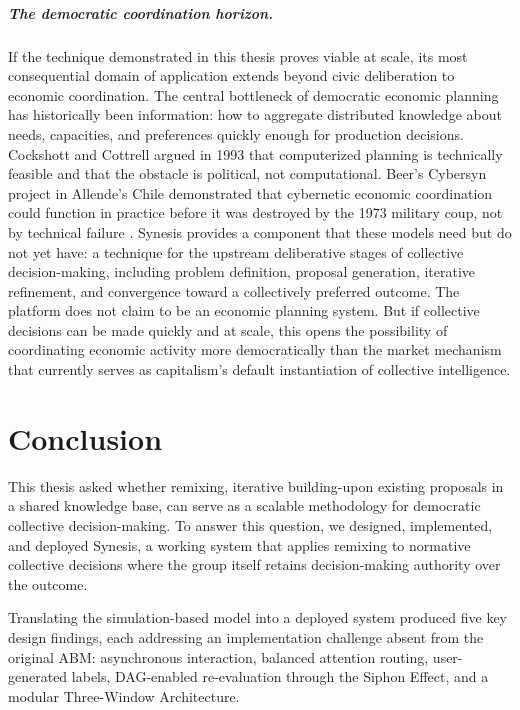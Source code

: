 \documentclass[a4paper, 12pt, twoside]{iviathesis}
\begin{document}
\paragraph{The democratic coordination horizon.}
If the technique demonstrated in this thesis proves viable at scale, its most consequential domain of application extends beyond civic deliberation to economic coordination. The central bottleneck of democratic economic planning has historically been information: how to aggregate distributed knowledge about needs, capacities, and preferences quickly enough for production decisions. Cockshott and Cottrell \cite{cockshott1993towards} argued in 1993 that computerized planning is technically feasible and that the obstacle is political, not computational. Beer's Cybersyn project in Allende's Chile demonstrated that cybernetic economic coordination could function in practice before it was destroyed by the 1973 military coup, not by technical failure \cite{medina2011cybernetic}. Synesis provides a component that these models need but do not yet have: a technique for the upstream deliberative stages of collective decision-making, including problem definition, proposal generation, iterative refinement, and convergence toward a collectively preferred outcome. The platform does not claim to be an economic planning system. But if collective decisions can be made quickly and at scale, this opens the possibility of coordinating economic activity more democratically than the market mechanism that currently serves as capitalism's default instantiation of collective intelligence.


\chapter{Conclusion}
\label{ch:conclusion}

This thesis asked whether remixing, iterative building-upon existing proposals in a shared knowledge base, can serve as a scalable methodology for democratic collective decision-making. To answer this question, we designed, implemented, and deployed Synesis, a working system that applies remixing to normative collective decisions where the group itself retains decision-making authority over the outcome.

Translating the simulation-based model into a deployed system produced five key design findings, each addressing an implementation challenge absent from the original ABM: asynchronous interaction, balanced attention routing, user-generated labels, DAG-enabled re-evaluation through the Siphon Effect, and a modular Three-Window Architecture.
\end{document}
